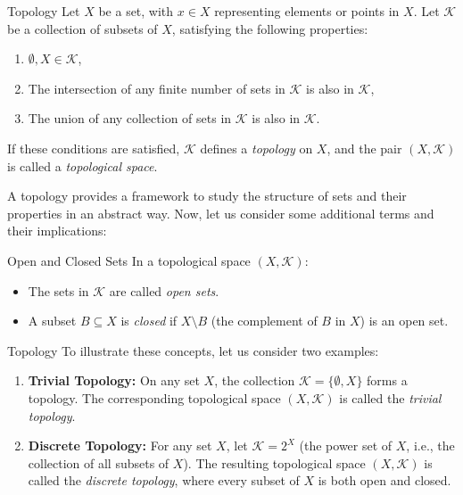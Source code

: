 \begin{defbox}{Topology}
Let $X$ be a set, with $x \in X$ representing elements or points in $X$. Let $\mathcal{K}$ be a collection of subsets of $X$, satisfying the following properties:
\begin{enumerate}
    \item $\emptyset, X \in \mathcal{K}$,
    \item The intersection of any finite number of sets in $\mathcal{K}$ is also in $\mathcal{K}$,
    \item The union of any collection of sets in $\mathcal{K}$ is also in $\mathcal{K}$.
\end{enumerate}
If these conditions are satisfied, $\mathcal{K}$ defines a \textit{topology} on $X$, and the pair $(X, \mathcal{K})$ is called a \textit{topological space}.
\end{defbox}

A topology provides a framework to study the structure of sets and their properties in an abstract way.
Now, let us consider some additional terms and their implications:

\begin{defbox}{Open and Closed Sets}
    In a topological space $(X, \mathcal{K})$:
\begin{itemize}
    \item The sets in $\mathcal{K}$ are called \textit{open sets}.
    \item A subset $B \subseteq X$ is \textit{closed} if $X \setminus B$ (the complement of $B$ in $X$) is an open set.
\end{itemize}
\end{defbox} 


\begin{exbox}{Topology}
To illustrate these concepts, let us consider two examples:
\begin{enumerate}
    \item \textbf{Trivial Topology:} On any set $X$, the collection $\mathcal{K} = \{ \emptyset, X \}$ forms a topology. The corresponding topological space $(X, \mathcal{K})$ is called the \textit{trivial topology}.
    \item \textbf{Discrete Topology:} For any set $X$, let $\mathcal{K} = 2^X$ (the power set of $X$, i.e., the collection of all subsets of $X$). The resulting topological space $(X, \mathcal{K})$ is called the \textit{discrete topology}, where every subset of $X$ is both open and closed.
\end{enumerate}
\end{exbox}

